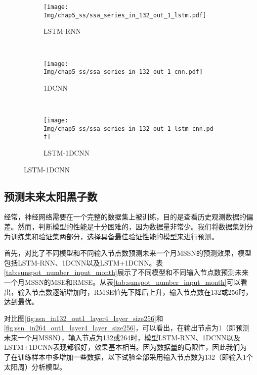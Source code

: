 \begin{figure}[!htbp]
    \centering
    \begin{subfigure}[b]{1.0\textwidth}
      \caption{LSTM-RNN} 
      \vspace{-0.35cm}
      \texttt{[image: Img/chap5\_ss/ssa\_series\_in\_132\_out\_1\_lstm.pdf]}
      \label{fig:ssa_series_in_132_out_1_lstm}
    \end{subfigure}    \\
    \vspace{-1cm}
    \begin{subfigure}[b]{1.0\textwidth}
      \caption{1DCNN}
      \vspace{-0.35cm}
      \texttt{[image: Img/chap5\_ss/ssa\_series\_in\_132\_out\_1\_cnn.pdf]}
      \label{fig:ssa_series_in_132_out_1_cnn}
    \end{subfigure} \\
    \vspace{-1cm}
    \begin{subfigure}[b]{1.0\textwidth}
      \caption{LSTM-1DCNN}
      \vspace{-0.35cm}
      \texttt{[image: Img/chap5\_ss/ssa\_series\_in\_132\_out\_1\_lstm\_cnn.pdf]}
      \label{fig:ssa_series_in_132_out_1_lstm_cnn}
      \end{subfigure}
    \vspace{-2cm}
    \label{fig:ssa_series_in_132_out_1}
  \end{figure}

\subsection{预测未来太阳黑子数}\label{sec:ss_result_number}

经常，神经网络需要在一个完整的数据集上被训练，目的是查看历史观测数据的偏差。然而，判断模型的性能是十分困难的，因为数据量非常少。我们将数据集划分为训练集和验证集两部分，选择具备最佳验证性能的模型来进行预测。

首先，对比了不同模型和不同输入节点数预测未来一个月MSSN的预测效果，模型包括LSTM-RNN、1DCNN以及LSTM+1DCNN。表\ref{tab:sunspot_number_input_month}展示了不同模型和不同输入节点数预测未来一个月MSSN的MSE和RMSE。从表\ref{tab:sunspot_number_input_month}可以看出，输入节点数逐渐增加时，RMSE值先下降后上升，输入节点数在132或256时，达到最优。

对比图\ref{fig:ssn_in132_out1_layer4_layer_size256}和\ref{fig:ssn_in264_out1_layer4_layer_size256}，可以看出，在输出节点为1（即预测未来一个月MSSN），输入节点为132或264时，模型LSTM-RNN、1DCNN以及LSTM+1DCNN表现都很好，效果基本相当。因为数据量的局限性，因此我们为了在训练样本中多增加一些数据，以下试验全部采用输入节点数为132（即输入1个太阳周）分析模型。


